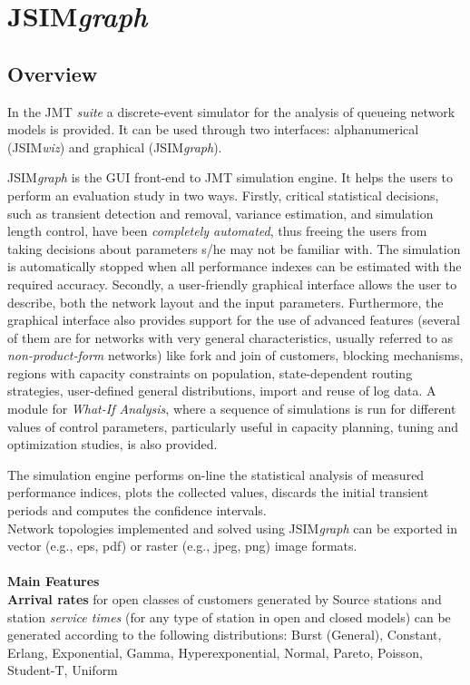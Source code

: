 \chapter{JSIM\emph{graph}}
\label{cha:jsimgraph}
\section{Overview}
In the JMT \emph{suite} a discrete-event simulator for the
analysis of queueing network models is provided. It can be used
through two interfaces: alphanumerical (JSIM\emph{wiz}) and
graphical (JSIM\emph{graph}).

JSIM\emph{graph} is the GUI front-end to JMT simulation engine. It
helps the users to perform an evaluation study in two ways.
Firstly, critical statistical decisions, such as transient
detection and removal, variance estimation, and simulation length
control, have been \emph{completely automated}, thus freeing the
users from taking decisions about parameters s/he may not be
familiar with. The simulation is automatically stopped when all
performance indexes can be estimated with the required accuracy.
Secondly, a user-friendly graphical interface allows the user to
describe, both the network layout and the input parameters.
Furthermore, the graphical interface also provides support for the
use of advanced features (several of them are for networks with
very general characteristics, usually referred to as
\emph{non-product-form} networks) like fork and join of customers,
blocking mechanisms, regions with capacity constraints on
population, state-dependent routing strategies, user-defined
general distributions, import and reuse of log data. A module for
\emph{What-If Analysis}, where a sequence of simulations is run
for different values of control parameters, particularly useful in
capacity planning, tuning and optimization studies, is also
provided.

The simulation engine performs on-line the statistical analysis of
measured performance indices, plots the collected values, discards
the initial
transient periods and computes the confidence intervals.\\
Network topologies implemented and solved using JSIM\emph{graph}
can be exported in vector (e.g., eps, pdf) or raster (e.g., jpeg,
png) image formats.\\

\ \\
\noindent \textbf{\large Main Features}\\
\noindent \textbf{Arrival rates} for open classes of customers
generated by Source stations and station \emph{service times} (for
any type of station in open and closed models) can be generated
according to the following distributions: Burst (General),
Constant, Erlang, Exponential, Gamma, Hyperexponential, Normal,
Pareto, Poisson,
Student-T, Uniform \\

